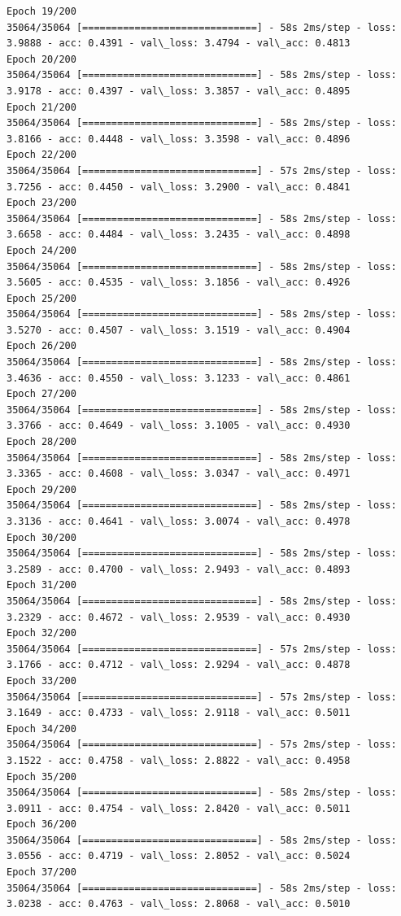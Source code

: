 \documentclass[11pt]{article}
\begin{document}
\begin{Verbatim}[commandchars=\\\{\}]
Epoch 19/200
35064/35064 [==============================] - 58s 2ms/step - loss: 3.9888 - acc: 0.4391 - val\_loss: 3.4794 - val\_acc: 0.4813
Epoch 20/200
35064/35064 [==============================] - 58s 2ms/step - loss: 3.9178 - acc: 0.4397 - val\_loss: 3.3857 - val\_acc: 0.4895
Epoch 21/200
35064/35064 [==============================] - 58s 2ms/step - loss: 3.8166 - acc: 0.4448 - val\_loss: 3.3598 - val\_acc: 0.4896
Epoch 22/200
35064/35064 [==============================] - 57s 2ms/step - loss: 3.7256 - acc: 0.4450 - val\_loss: 3.2900 - val\_acc: 0.4841
Epoch 23/200
35064/35064 [==============================] - 58s 2ms/step - loss: 3.6658 - acc: 0.4484 - val\_loss: 3.2435 - val\_acc: 0.4898
Epoch 24/200
35064/35064 [==============================] - 58s 2ms/step - loss: 3.5605 - acc: 0.4535 - val\_loss: 3.1856 - val\_acc: 0.4926
Epoch 25/200
35064/35064 [==============================] - 58s 2ms/step - loss: 3.5270 - acc: 0.4507 - val\_loss: 3.1519 - val\_acc: 0.4904
Epoch 26/200
35064/35064 [==============================] - 58s 2ms/step - loss: 3.4636 - acc: 0.4550 - val\_loss: 3.1233 - val\_acc: 0.4861
Epoch 27/200
35064/35064 [==============================] - 58s 2ms/step - loss: 3.3766 - acc: 0.4649 - val\_loss: 3.1005 - val\_acc: 0.4930
Epoch 28/200
35064/35064 [==============================] - 58s 2ms/step - loss: 3.3365 - acc: 0.4608 - val\_loss: 3.0347 - val\_acc: 0.4971
Epoch 29/200
35064/35064 [==============================] - 58s 2ms/step - loss: 3.3136 - acc: 0.4641 - val\_loss: 3.0074 - val\_acc: 0.4978
Epoch 30/200
35064/35064 [==============================] - 58s 2ms/step - loss: 3.2589 - acc: 0.4700 - val\_loss: 2.9493 - val\_acc: 0.4893
Epoch 31/200
35064/35064 [==============================] - 58s 2ms/step - loss: 3.2329 - acc: 0.4672 - val\_loss: 2.9539 - val\_acc: 0.4930
Epoch 32/200
35064/35064 [==============================] - 57s 2ms/step - loss: 3.1766 - acc: 0.4712 - val\_loss: 2.9294 - val\_acc: 0.4878
Epoch 33/200
35064/35064 [==============================] - 57s 2ms/step - loss: 3.1649 - acc: 0.4733 - val\_loss: 2.9118 - val\_acc: 0.5011
Epoch 34/200
35064/35064 [==============================] - 57s 2ms/step - loss: 3.1522 - acc: 0.4758 - val\_loss: 2.8822 - val\_acc: 0.4958
Epoch 35/200
35064/35064 [==============================] - 58s 2ms/step - loss: 3.0911 - acc: 0.4754 - val\_loss: 2.8420 - val\_acc: 0.5011
Epoch 36/200
35064/35064 [==============================] - 58s 2ms/step - loss: 3.0556 - acc: 0.4719 - val\_loss: 2.8052 - val\_acc: 0.5024
Epoch 37/200
35064/35064 [==============================] - 58s 2ms/step - loss: 3.0238 - acc: 0.4763 - val\_loss: 2.8068 - val\_acc: 0.5010

\end{Verbatim}
\end{document}
